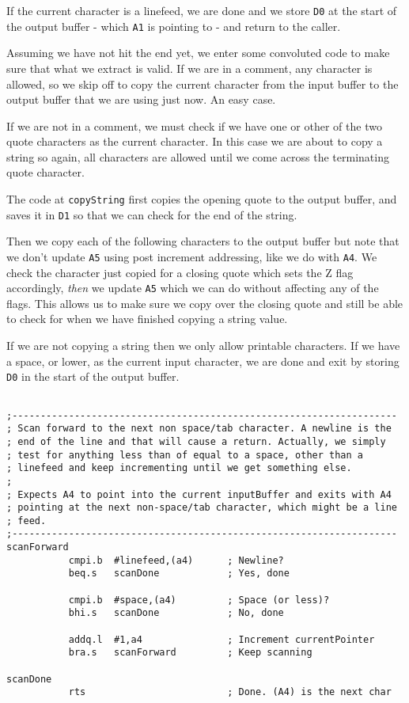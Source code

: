 If the current character is a linefeed, we are done and we store \texttt{D0} at the start of the output buffer - which \texttt{A1} is pointing to - and return to the caller.

Assuming we have not hit the end yet, we enter some convoluted code to make sure that what we extract is valid. If we are in a comment, any character is allowed, so we skip off to copy the current character from the input buffer to the output buffer that we are using just now. An easy case.

If we are not in a comment, we must check if we have one or other of the two quote characters as the current character. In this case we are about to copy a string so again, all characters are allowed until we come across the terminating quote character.

The code at \texttt{copyString} first copies the opening quote to the output buffer, and saves it in \texttt{D1} so that we can check for the end of the string.

Then we copy each of the following characters to the output buffer but note that we don't update \texttt{A5} using post increment addressing, like we do with \texttt{A4}. We check the character just copied for a closing quote which sets the Z flag accordingly, \emph{then} we update \texttt{A5} which we can do without affecting any of the flags. This allows us to make sure we copy over the closing quote and still be able to check for when we have finished copying a string value.

If we are not copying a string then we only allow printable characters. If we have a space, or lower, as the current input character, we are done and exit by storing \texttt{D0} in the start of the output buffer.

\begin{lstlisting}[firstnumber=last,caption={ASMReformat Source - Scanning the Input Lines}]

;--------------------------------------------------------------------
; Scan forward to the next non space/tab character. A newline is the
; end of the line and that will cause a return. Actually, we simply
; test for anything less than of equal to a space, other than a
; linefeed and keep incrementing until we get something else.
;
; Expects A4 to point into the current inputBuffer and exits with A4
; pointing at the next non-space/tab character, which might be a line
; feed.
;--------------------------------------------------------------------
scanForward
           cmpi.b  #linefeed,(a4)      ; Newline?
           beq.s   scanDone            ; Yes, done

           cmpi.b  #space,(a4)         ; Space (or less)?
           bhi.s   scanDone            ; No, done

           addq.l  #1,a4               ; Increment currentPointer
           bra.s   scanForward         ; Keep scanning

scanDone
           rts                         ; Done. (A4) is the next char
\end{lstlisting}

